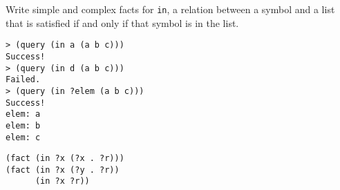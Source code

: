 \question Write simple and complex facts for {\tt in}, a relation between a
symbol and a list that is satisfied if and only if that symbol is in the list.

\begin{lstlisting}
> (query (in a (a b c)))
Success!
> (query (in d (a b c)))
Failed.
> (query (in ?elem (a b c)))
Success!
elem: a
elem: b
elem: c
\end{lstlisting}

\begin{solution}[2in]
\begin{lstlisting}
(fact (in ?x (?x . ?r)))
(fact (in ?x (?y . ?r))
      (in ?x ?r))
\end{lstlisting}
\end{solution}

